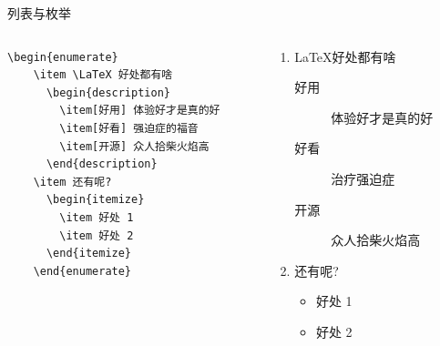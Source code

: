   \begin{frame}[fragile]{列表与枚举}
    \begin{columns}
    \begin{column}{.6\textwidth}
    \begin{lstlisting}[basicstyle=\ttfamily\small]
    \begin{enumerate}
    \item \LaTeX 好处都有啥
      \begin{description}
        \item[好用] 体验好才是真的好
        \item[好看] 强迫症的福音
        \item[开源] 众人拾柴火焰高
      \end{description}
    \item 还有呢?
      \begin{itemize}
        \item 好处 1
        \item 好处 2
      \end{itemize}
    \end{enumerate}
    \end{lstlisting}
    \end{column}
    \begin{column}{.4\textwidth}
    {\small
    \begin{enumerate}
    \item \LaTeX 好处都有啥
      \begin{description}
        \item[好用] 体验好才是真的好
        \item[好看] 治疗强迫症
        \item[开源] 众人拾柴火焰高
      \end{description}
    \item 还有呢?
      \begin{itemize}
        \item 好处 1
        \item 好处 2
      \end{itemize}
    \end{enumerate}
    }
    \end{column}
    \end{columns}
    
    \end{frame}
    


